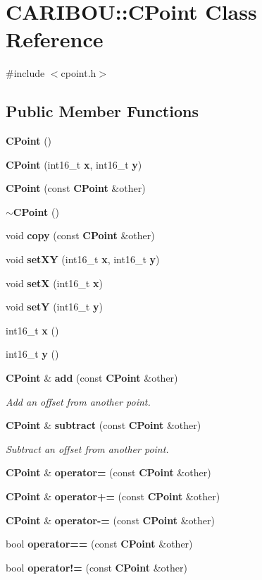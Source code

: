 \section{C\+A\+R\+I\+B\+OU\+:\+:C\+Point Class Reference}
\label{class_c_a_r_i_b_o_u_1_1_c_point}


{\ttfamily \#include $<$cpoint.\+h$>$}

\subsection*{Public Member Functions}
\begin{DoxyCompactItemize}
\item 
{\bf C\+Point} ()
\item 
{\bf C\+Point} (int16\+\_\+t {\bf x}, int16\+\_\+t {\bf y})
\item 
{\bf C\+Point} (const {\bf C\+Point} \&other)
\item 
{\bf $\sim$\+C\+Point} ()
\item 
void {\bf copy} (const {\bf C\+Point} \&other)
\item 
void {\bf set\+XY} (int16\+\_\+t {\bf x}, int16\+\_\+t {\bf y})
\item 
void {\bf setX} (int16\+\_\+t {\bf x})
\item 
void {\bf setY} (int16\+\_\+t {\bf y})
\item 
int16\+\_\+t {\bf x} ()
\item 
int16\+\_\+t {\bf y} ()
\item 
{\bf C\+Point} \& {\bf add} (const {\bf C\+Point} \&other)
\begin{DoxyCompactList}\small\item\em Add an offset from another point. \end{DoxyCompactList}\item 
{\bf C\+Point} \& {\bf subtract} (const {\bf C\+Point} \&other)
\begin{DoxyCompactList}\small\item\em Subtract an offset from another point. \end{DoxyCompactList}\item 
{\bf C\+Point} \& {\bf operator=} (const {\bf C\+Point} \&other)
\item 
{\bf C\+Point} \& {\bf operator+=} (const {\bf C\+Point} \&other)
\item 
{\bf C\+Point} \& {\bf operator-\/=} (const {\bf C\+Point} \&other)
\item 
bool {\bf operator==} (const {\bf C\+Point} \&other)
\item 
bool {\bf operator!=} (const {\bf C\+Point} \&other)
\end{DoxyCompactItemize}


